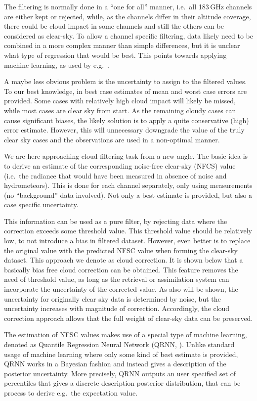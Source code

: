 \documentclass[amt, manuscript]{copernicus}
\begin{document}
The filtering is normally done in a ``one for all'' manner, i.e.\ all 183\,GHz
channels are either kept or rejected, while, as the channels differ in their
altitude coverage, there could be cloud impact in some channels and still the
others can be considered as clear-sky. To allow a channel specific filtering,
data likely need to be combined in a more complex manner than simple
differences, but it is unclear what type of regression that would be best. This
points towards applying machine learning, as used by e.g.\
\citet{favrichon2019detecting}.

A maybe less obvious problem is the uncertainty to assign to the filtered
values. To our best knowledge, in best case estimates of mean and worst case
errors are provided. Some cases with relatively high cloud impact will likely be
missed, while most cases are clear sky from start. As the remaining cloudy
cases can cause significant biases, the likely solution is to apply a quite
conservative (high) error estimate. However, this will unnecessary downgrade
the value of the truly clear sky cases and the observations are used in a
non-optimal manner.

We are here approaching cloud filtering task from a new angle. The basic idea
is to derive an estimate of the corresponding noise-free clear-sky (NFCS) value
(i.e.\ the radiance that would have been measured in absence of noise and
hydrometeors). This is done for each channel separately, only using
measurements (no ``background'' data involved). Not only a best estimate is
provided, but also a case specific uncertainty.

This information can be used as a pure filter, by rejecting data where the
correction exceeds some threshold value. This threshold value should be
relatively low, to not introduce a bias in filtered dataset. However, even
better is to replace the original value with the predicted NFSC value when
forming the clear-sky dataset. This approach we denote as cloud correction. It
is shown below that a basically bias free cloud correction can be obtained.
This feature removes the need of threshold value, as long as the retrieval or
assimilation system can incorporate the uncertainty of the corrected value. As
also will be shown, the uncertainty for originally clear sky data is determined
by noise, but the uncertainty increases with magnitude of correction.
Accordingly, the cloud correction approach allows that the full weight of
clear-sky data can be preserved.

The estimation of NFSC values makes use of a special type of machine learning,
denoted as Quantile Regression Neural Network (QRNN,
\citet{pfreundschuh:aneur:18}). Unlike standard usage of machine learning where
only some kind of best estimate is provided, QRNN works in a Bayesian fashion
and instead gives a description of the posterior uncertainty. More precisely,
QRNN outputs an user specified set of percentiles that gives a discrete
description posterior distribution, that can be process to derive e.g.\ the
expectation value.
\end{document}

